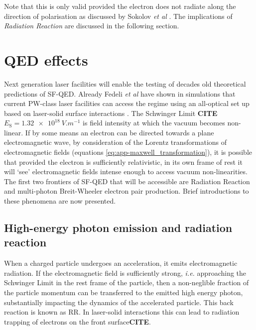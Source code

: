 Note that this is only valid provided the electron does not radiate along the direction of polarisation as discussed by Sokolov \textit{et al} \cite{sokolovDynamicsEmittingElectrons2009}. The implications of \textit{Radiation Reaction }are discussed in the following section.

\section{QED effects}
Next generation laser facilities will enable the testing of decades old theoretical predictions of \ac{SF-QED}. Already Fedeli \textit{et al} have shown in simulations that current PW-class laser facilities can access the regime using an all-optical set up based on laser-solid surface interactions \cite{fedeliProbingStrongfieldQED2020}. The Schwinger Limit \textbf{CITE} $E_\mathrm{S} = \qty{1.32e18}{V.m^{-1}}$ is field intensity at which the vacuum becomes non-linear. If by some means an electron can be directed towards a plane electromagnetic wave, by consideration of the Lorentz transformations of electromagnetic fields (equations \ref{eq:app-maxwell_transformation}), it is possible that provided the electron is sufficiently relativistic, in its own frame of rest it will `see' electromagnetic fields intense enough to access vacuum non-linearities. The first two frontiers of SF-QED that will be accessible are Radiation Reaction and multi-photon Breit-Wheeler electron pair production. Brief introductions to these phenomena are now presented.

\subsection{High-energy photon emission and radiation reaction}
When a charged particle undergoes an acceleration, it emits electromagnetic radiation. If the electromagnetic field is sufficiently strong, \textit{i.e.} approaching the Schwinger Limit in the rest frame of the particle, then a non-neglible fraction of the particle momentum can be transferred to the emitted high energy photon, substantially impacting the dynamics of the accelerated particle. This back reaction is known as \ac{RR}. In laser-solid interactions this can lead to radiation trapping of electrons on the front surface\textbf{CITE}.

